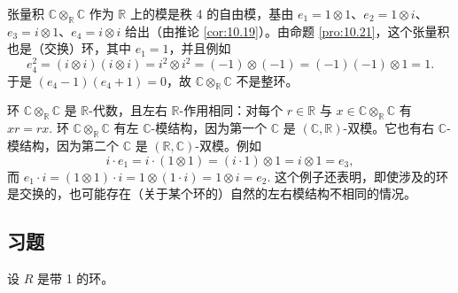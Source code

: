 \begin{example}
张量积 \(\mathbb{C} \otimes_{\mathbb{R}} \mathbb{C}\) 作为 \(\mathbb{R}\) 上的模是秩 4 的自由模，基由 \(e_1 = 1 \otimes 1\)、\(e_2 = 1 \otimes i\)、\(e_3 = i \otimes 1\)、\(e_4 = i \otimes i\) 给出（由推论 \ref{cor:10.19}）。由命题 \ref{pro:10.21}，这个张量积也是（交换）环，其中 \(e_1 = 1\)，并且例如
\[
e_4^2 = (i \otimes i)(i \otimes i) = i^2 \otimes i^2 = (-1) \otimes (-1) = (-1)(-1) \otimes 1 = 1.
\]
于是 \((e_4-1)(e_4+1) = 0\)，故 \(\mathbb{C} \otimes_{\mathbb{R}} \mathbb{C}\) 不是整环。

环 \(\mathbb{C} \otimes_{\mathbb{R}} \mathbb{C}\) 是 \(\mathbb{R}\)-代数，且左右 \(\mathbb{R}\)-作用相同：对每个 \(r \in \mathbb{R}\) 与 \(x \in \mathbb{C} \otimes_{\mathbb{R}} \mathbb{C}\) 有 \(xr = rx\). 环 \(\mathbb{C} \otimes_{\mathbb{R}} \mathbb{C}\) 有左 \(\mathbb{C}\)-模结构，因为第一个 \(\mathbb{C}\) 是 \((\mathbb{C}, \mathbb{R})\)-双模。它也有右 \(\mathbb{C}\)-模结构，因为第二个 \(\mathbb{C}\) 是 \((\mathbb{R}, \mathbb{C})\)-双模。例如
\[
i \cdot e_1 = i \cdot (1 \otimes 1) = (i \cdot 1) \otimes 1 = i \otimes 1 = e_3,
\]
而 \(e_1 \cdot i = (1 \otimes 1) \cdot i = 1 \otimes (1 \cdot i) = 1 \otimes i = e_2\). 这个例子还表明，即使涉及的环是交换的，也可能存在（关于某个环的）自然的左右模结构不相同的情况。
\end{example}

\subsection*{习题}

\noindent 设 \(R\) 是带 1 的环。

